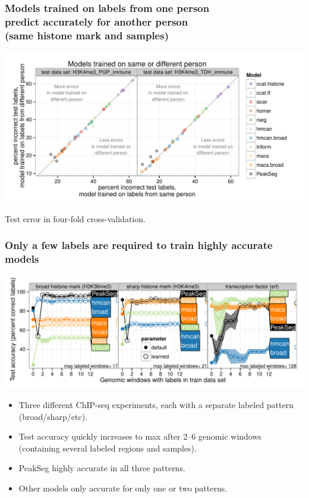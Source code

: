 \documentclass{beamer}
\begin{document}
\begin{frame}
  \frametitle{Models trained on labels from one person\\
predict accurately for another person\\
    (same histone mark and samples)}
  \includegraphics[width=1.1\textwidth]{figure-test-H3K4me3-annotators.pdf}

  Test error in four-fold cross-validation.
\end{frame}

\begin{frame}
  \frametitle{Only a few labels are required to train highly accurate models}
  \includegraphics[width=1.1\textwidth]{figure-test-error-decreases-mean.pdf}

  \begin{itemize}
  \item Three different ChIP-seq experiments, each with a separate
    labeled pattern (broad/sharp/etc).
  \item Test accuracy quickly increases to max after 2--6
    genomic windows (containing several labeled regions and samples).
  \item PeakSeg highly accurate in all three patterns.
  \item Other models only accurate for only one or two patterns.
  \end{itemize}
\end{frame}
\end{document}
